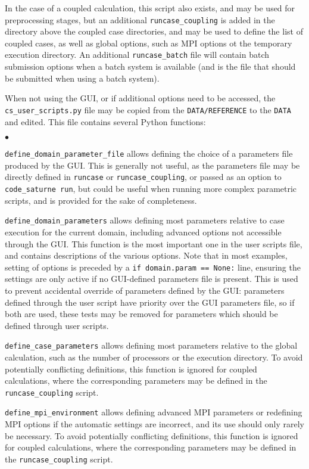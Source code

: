{{{In the case of a coupled calculation, this script also exists, and
may be used for preprocessing stages, but an additional
\texttt{runcase\_coupling} is added in the directory above the coupled case
directories, and may be used to define the list of coupled cases,
as well as global options, such as MPI options ot the temporary
execution directory. An additional \texttt{runcase\_batch} file will
contain batch submission options when a batch system is available
(and is the file that should be submitted when using a batch system).

When not using the GUI, or if additional options need to be accessed,
the \texttt{cs\_user\_scripts.py} file may be copied from
the \texttt{DATA/REFERENCE} to the \texttt{DATA} and edited.
This file contains several Python functions:

\begin{list}{$\bullet$}{}

\item \texttt{define\_domain\_parameter\_file} allows defining
 the choice of a parameters file produced by the GUI. This is
 generally not useful, as the parameters file may be directly
 defined in \texttt{runcase} or \texttt{runcase\_coupling}, or passed
 as an option to \texttt{code\_saturne run}, but could be useful
 when running more complex parametric scripts, and is provided for
 the sake of completeness.
\item \texttt{define\_domain\_parameters} allows defining
 most parameters relative to case execution for the current
 domain, including advanced options not accessible
 through the GUI. This function is the most important one in the user
 scripts file, and contains descriptions of the various options.
 Note that in most examples, setting of options is preceded by
 a \texttt{if domain.param == None:} line, ensuring the settings
 are only active if no GUI-defined parameters file is present.
 This is used to prevent accidental override of parameters defined
 by the GUI: parameters defined through the user script have priority
 over the GUI parameters file, so if both are used, these tests
 may be removed for parameters which should be defined through
 user scripts.
\item \texttt{define\_case\_parameters} allows defining
 most parameters relative to the global calculation, such as
 the number of processors or the execution directory.
 To avoid potentially conflicting definitions, this function is ignored
 for coupled calculations, where the corresponding parameters
 may be defined in the \texttt{runcase\_coupling} script.
\item \texttt{define\_mpi\_environment} allows defining
 advanced MPI parameters or redefining MPI options if the automatic
 settings are incorrect, and its use should only rarely be necessary.
 To avoid potentially conflicting definitions, this function is ignored
 for coupled calculations, where the corresponding parameters
 may be defined in the \texttt{runcase\_coupling} script.
\end{list}

}}}
